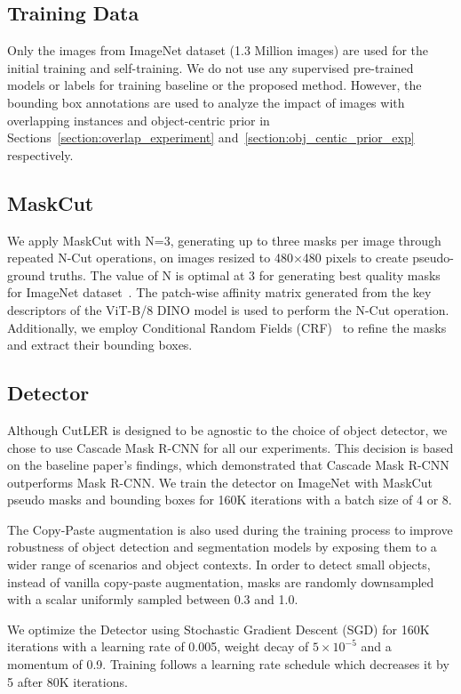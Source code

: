 \subsection{Training Data}
Only the images from ImageNet dataset (1.3 Million images) are used for the initial training and self-training. We do not use any supervised pre-trained models or labels for training baseline or the proposed method. However, the bounding box annotations are used to analyze the impact of images with overlapping instances and object-centric prior in Sections~\ref{section:overlap_experiment} and~\ref{section:obj_centic_prior_exp} respectively.

\subsection{MaskCut}

We apply MaskCut with N=3, generating up to three masks per image through repeated N-Cut operations, on images resized to 480×480 pixels to create pseudo-ground truths. The value of N is optimal at 3 for generating best quality masks for ImageNet dataset~\cite{wang2023cut}. The patch-wise affinity matrix generated from the key descriptors of the ViT-B/8 DINO model is used to perform the N-Cut operation. Additionally, we employ Conditional Random Fields (CRF)~\cite{sutton2010introductionconditionalrandomfields} to refine the masks and extract their bounding boxes.

\subsection{Detector}
Although CutLER is designed to be agnostic to the choice of object detector, we chose to use Cascade Mask R-CNN for all our experiments. This decision is based on the baseline paper's findings, which demonstrated that Cascade Mask R-CNN outperforms Mask R-CNN. We train the detector on ImageNet with MaskCut pseudo masks and bounding boxes for 160K iterations with a batch size of 4 or 8. 

The Copy-Paste augmentation is also used during the training process to improve robustness of object detection and segmentation models by exposing them to a wider range of scenarios and object contexts. In order to detect small objects, instead of vanilla copy-paste augmentation, masks are randomly downsampled with a scalar uniformly sampled between 0.3 and 1.0. 

We optimize the Detector using Stochastic Gradient Descent (SGD) for 160K iterations with a learning rate of 0.005, weight decay of \(5×10^{−5}\) and a momentum of 0.9. Training follows a learning rate schedule which decreases it by 5 after 80K iterations.

